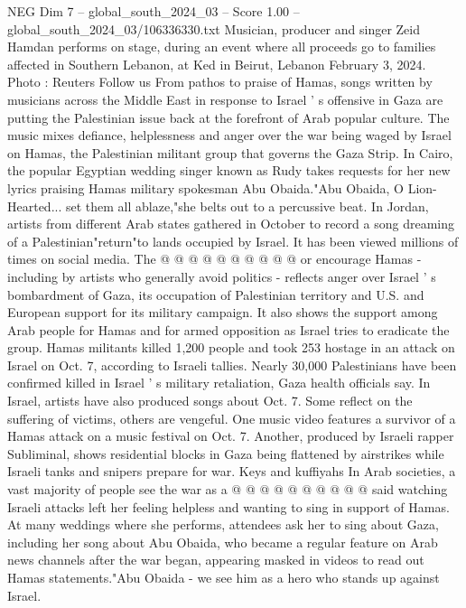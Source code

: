 \begin{textsample}{NEG Dim 7 – global\_south\_2024\_03 – Score 1.00 – global\_south\_2024\_03/106336330.txt}  \label{ex:f7_neg_292}
Musician, producer and singer Zeid Hamdan performs on stage, during an event where all proceeds go to families affected in Southern Lebanon, at Ked in Beirut, Lebanon February 3, 2024.
Photo : Reuters Follow us From pathos to praise of Hamas, songs written by musicians across the Middle East in response to Israel ' s offensive in Gaza are putting the Palestinian issue back at the forefront of Arab popular culture.
The music mixes defiance, helplessness and anger over the war being waged by Israel on Hamas, the Palestinian militant group that governs the Gaza Strip.
In Cairo, the popular Egyptian wedding singer known as Rudy takes requests for her new lyrics praising Hamas military spokesman Abu Obaida."Abu Obaida, O Lion-Hearted... set them all ablaze,"she belts out to a percussive beat.
In Jordan, artists from different Arab states gathered in October to record a song dreaming of a Palestinian"return"to lands occupied by Israel.
It has been viewed millions of times on social media.
The @ @ @ @ @ @ @ @ @ @ or encourage Hamas - including by artists who generally avoid politics - reflects anger over Israel ' s bombardment of Gaza, its occupation of Palestinian territory and U.S. and European support for its military campaign.
It also shows the support among Arab people for Hamas and for armed opposition as Israel tries to eradicate the group.
Hamas militants killed 1,200 people and took 253 hostage in an attack on Israel on Oct. 7, according to Israeli tallies.
Nearly 30,000 Palestinians have been confirmed killed in Israel ' s military retaliation, Gaza health officials say.
In Israel, artists have also produced songs about Oct. 7.
Some reflect on the suffering of victims, others are vengeful.
One music video features a survivor of a Hamas attack on a music festival on Oct. 7.
Another, produced by Israeli rapper Subliminal, shows residential blocks in Gaza being flattened by airstrikes while Israeli tanks and snipers prepare for war.
Keys and kuffiyahs In Arab societies, a vast majority of people see the war as a @ @ @ @ @ @ @ @ @ @ said watching Israeli attacks left her feeling helpless and wanting to sing in support of Hamas.
At many weddings where she performs, attendees ask her to sing about Gaza, including her song about Abu Obaida, who became a regular feature on Arab news channels after the war began, appearing masked in videos to read out Hamas statements."Abu Obaida - we see him as a hero who stands up against Israel.

\end{textsample}
